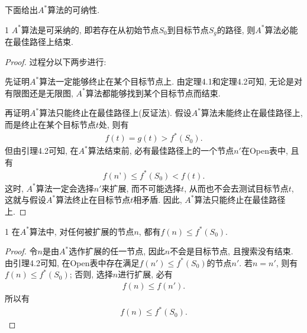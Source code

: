 下面给出$A^*$算法的可纳性.
\begin{mythm}{}{1}\label{Thm403}
    $A^*$算法是可采纳的, 即若存在从初始节点$S_0$到目标节点$S_g$的路径, 则$A^*$算法必能在最佳路径上结束.
\end{mythm}
\begin{proof}
过程分以下两步进行:

先证明$A^*$算法一定能够终止在某个目标节点上. 由定理4.1和定理4.2可知, 无论是对有限图还是无限图, $A^*$算法都能够找到某个目标节点而结束.

再证明$A^*$算法只能终止在最佳路径上(反证法).
假设$A^*$算法未能终止在最佳路径上, 而是终止在某个目标节点$t$处, 则有
\begin{align}
    f(t)=g(t)>f^*(S_0).
\end{align}
但由引理4.2可知, 在$A^*$算法结束前, 必有最佳路径上的一个节点$n'$在Open表中, 且有
\begin{align}
    f(n’)\leq f^*(S_0)<f(t).
\end{align}
这时, $A^*$算法一定会选择$n'$来扩展, 而不可能选择$t$, 从而也不会去测试目标节点$t$, 这就与假设$A^*$算法终止在目标节点$t$相矛盾. 因此, $A^*$算法只能终止在最佳路径上.
\end{proof}

\begin{myprop}{}{1}
    在$A^*$算法中, 对任何被扩展的节点$n$, 都有$f(n)\leq f^*(S_0)$.
\end{myprop}
\begin{proof}
令$n$是由$A^*$选作扩展的任一节点, 因此$n$不会是目标节点, 且搜索没有结束. 由引理4.2可知, 在Open表中存在满足$f(n')\leq f^*(S_0)$的节点$n'$.
若$n=n'$, 则有$f(n)\leq f^*(S_0)$; 否则, 选择$n$进行扩展, 必有
\begin{align}
    f(n) \leq f(n').
\end{align}
所以有
\begin{align}
    f(n)\leq f^*(S_0).
\end{align}
\end{proof}
